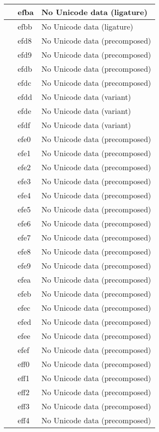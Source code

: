 \documentclass[12pt,letterpaper,openany]{book}
\begin{document}
\begin{center}
\begin{supertabular}{|m{0.25in}|m{0.5in}|m{4in}|}
 & efba & No Unicode data (ligature)\\\hline
 & efbb & No Unicode data (ligature)\\\hline
 & efd8 & No Unicode data (precomposed)\\\hline
 & efd9 & No Unicode data (precomposed)\\\hline
 & efdb & No Unicode data (precomposed)\\\hline
 & efdc & No Unicode data (precomposed)\\\hline
 & efdd & No Unicode data (variant)\\\hline
 & efde & No Unicode data (variant)\\\hline
 & efdf & No Unicode data (variant)\\\hline
 & efe0 & No Unicode data (precomposed)\\\hline
 & efe1 & No Unicode data (precomposed)\\\hline
 & efe2 & No Unicode data (precomposed)\\\hline
 & efe3 & No Unicode data (precomposed)\\\hline
 & efe4 & No Unicode data (precomposed)\\\hline
 & efe5 & No Unicode data (precomposed)\\\hline
 & efe6 & No Unicode data (precomposed)\\\hline
 & efe7 & No Unicode data (precomposed)\\\hline
 & efe8 & No Unicode data (precomposed)\\\hline
 & efe9 & No Unicode data (precomposed)\\\hline
 & efea & No Unicode data (precomposed)\\\hline
 & efeb & No Unicode data (precomposed)\\\hline
 & efec & No Unicode data (precomposed)\\\hline
 & efed & No Unicode data (precomposed)\\\hline
 & efee & No Unicode data (precomposed)\\\hline
 & efef & No Unicode data (precomposed)\\\hline
 & eff0 & No Unicode data (precomposed)\\\hline
 & eff1 & No Unicode data (precomposed)\\\hline
 & eff2 & No Unicode data (precomposed)\\\hline
 & eff3 & No Unicode data (precomposed)\\\hline
 & eff4 & No Unicode data (precomposed)\\\hline

\end{supertabular}
\end{center}
\end{document}
